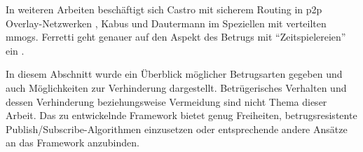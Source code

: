 In weiteren Arbeiten beschäftigt sich Castro mit sicherem Routing in p2p Overlay-Netzwerken \cite{Castro2002Secure}, Kabus \cite{Kabus2005Addressing} und Dautermann \cite{Dautermann2007} im Speziellen mit verteilten \acp{mmog}. Ferretti geht genauer auf den Aspekt des Betrugs mit \enquote{Zeitspielereien} ein \cite{Ferretti2008Cheating}.

In diesem Abschnitt wurde ein Überblick möglicher Betrugsarten gegeben und auch Möglichkeiten zur Verhinderung dargestellt. Betrügerisches Verhalten und dessen Verhinderung beziehungsweise Vermeidung sind nicht Thema dieser Arbeit. Das zu entwickelnde Framework bietet genug Freiheiten, betrugsresistente Publish/Subscribe-Algorithmen einzusetzen oder entsprechende andere Ansätze an das Framework anzubinden.
